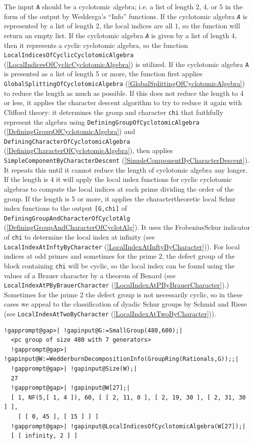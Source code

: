 \documentclass[a4paper,11pt]{report}
\begin{document}
{{{ The input \texttt{A} should be a cyclotomic algebra; i.e. a list of length 2, 4, or 5 in the form
of the output by \textsf{Wedderga}'s ``\texttt{}Info'' functions. If the cyclotomic algebra \mbox{\texttt{\mdseries\slshape A}} is represented by a list of length 2, the local indices are all $1$, so the function will return an empty list. If the cyclotomic algebra \mbox{\texttt{\mdseries\slshape A}} is given by a list of length 4, then it represents a cyclic cyclotomic
algebra, so the function \texttt{LocalIndicesOfCyclicCyclotomicAlgebra} (\ref{LocalIndicesOfCyclicCyclotomicAlgebra}) is utilized. If the cyclotomic algebra \texttt{A} is presented as a list of length 5 or more, the function first applies \texttt{GlobalSplittingOfCyclotomicAlgebra} (\ref{GlobalSplittingOfCyclotomicAlgebra}) to reduce the length as much as possible. If this does not reduce the length
to 4 or less, it applies the character descent algorithm to try to reduce it
again with Clifford theory: it determines the group and character \texttt{chi} that faithfully represent the algebra using \texttt{DefiningGroupOfCyclotomicAlgebra} (\ref{DefiningGroupOfCyclotomicAlgebra}) and \texttt{DefiningCharacterOfCyclotomicAlgebra} (\ref{DefiningCharacterOfCyclotomicAlgebra}), then applies \texttt{SimpleComponentByCharacterDescent} (\ref{SimpleComponentByCharacterDescent}). It repeats this until it cannot reduce the length of cyclotomic algebra any
longer. If the length is 4 it will apply the local index functions for cyclic
cyclotomic algebras to compute the local indices at each prime dividing the
order of the group. If the length is 5 or more, it applies the
character\texttt{}theoretic local Schur index functions to the
output \texttt{[G,chi]} of \texttt{DefiningGroupAndCharacterOfCyclotAlg} (\ref{DefiningGroupAndCharacterOfCyclotAlg}). It uses the Frobenius\texttt{}Schur indicator of \texttt{chi} to determine the local index at infinity (see \texttt{LocalIndexAtInftyByCharacter} (\ref{LocalIndexAtInftyByCharacter})). For local indices at odd primes and sometimes for the prime $2$, the defect group of the block containing \texttt{chi} will be cyclic, so the local index can be found using the values of a Brauer
character by a theorem of Benard (see \texttt{LocalIndexAtPByBrauerCharacter} (\ref{LocalIndexAtPByBrauerCharacter}).) Sometimes for the prime 2 the defect group is not necessarily cyclic, so in
these cases we appeal to the classification of dyadic Schur groups by Schmid
and Riese (see \texttt{LocalIndexAtTwoByCharacter} (\ref{LocalIndexAtTwoByCharacter})). 
\begin{Verbatim}[commandchars=!@|,fontsize=\small,frame=single,label=Example]
  !gapprompt@gap>| !gapinput@G:=SmallGroup(480,600);|
  <pc group of size 480 with 7 generators>
  !gapprompt@gap>| !gapinput@W:=WedderburnDecompositionInfo(GroupRing(Rationals,G));;|
  !gapprompt@gap>| !gapinput@Size(W);|
  27
  !gapprompt@gap>| !gapinput@W[27];|
  [ 1, NF(5,[ 1, 4 ]), 60, [ [ 2, 11, 0 ], [ 2, 19, 30 ], [ 2, 31, 30 ] ],
    [ [ 0, 45 ], [ 15 ] ] ]
  !gapprompt@gap>| !gapinput@LocalIndicesOfCyclotomicAlgebra(W[27]);|
  [ [ infinity, 2 ] ]
\end{Verbatim}
 
}}}
\end{document}

